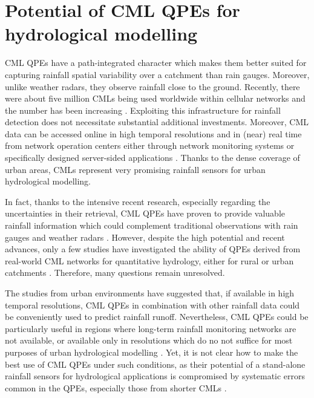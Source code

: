 \documentclass{ctuthesis}\usepackage[]{graphicx}\usepackage[]{color}
\begin{document}
\section{Potential of CML QPEs for hydrological modelling}

CML QPEs have a path-integrated character which makes them better suited for capturing rainfall spatial variability over a catchment than rain gauges. Moreover, unlike weather radars, they observe rainfall close to the ground. Recently, there were about five million CMLs being used worldwide within cellular networks and the number has been increasing \citep{ericssonEricssonMicrowaveOutlook2018}. Exploiting this infrastructure for rainfall detection does not necessitate substantial additional investments. Moreover, CML data can be accessed online in high temporal resolutions and in (near) real time from network operation centers either through network monitoring systems or specifically designed server-sided applications \citep{chwalaRealtimeDataAcquisition2016}. Thanks to the dense coverage of urban areas, CMLs represent very promising rainfall sensors for urban hydrological modelling.

In fact, thanks to the intensive recent research, especially regarding the uncertainties in their retrieval, CML QPEs have proven to provide valuable rainfall information which could complement traditional observations with rain gauges and weather radars \citep{chwalaCommercialMicrowaveLink2019, imhoffRainfallNowcastingUsing2020, riosgaonaRainfallRetrievalCommercial2018, uijlenhoetOpportunisticRemoteSensing2018}. However, despite the high potential and recent advances, only a few studies have investigated the ability of QPEs derived from real-world CML networks for quantitative hydrology, either for rural \citep{brauerEffectDifferencesRainfall2016, cazzanigaCalculatingHydrologicalResponse2020, smiatekPotentialCommercialMicrowave2017} or urban catchments \citep{dischImpactDifferentSources2019, stranskyRunoffPredictionUsing2018}. Therefore, many questions remain unresolved.

The studies from urban environments  \citep{dischImpactDifferentSources2019, stranskyRunoffPredictionUsing2018} have suggested that, if available in high temporal resolutions, CML QPEs in combination with other rainfall data could be conveniently used to predict rainfall runoff. Nevertheless, CML QPEs could be particularly useful in regions where long-term rainfall monitoring networks are not available, or available only in resolutions which do no not suffice for most purposes of urban hydrological modelling \citep{gossetImprovingRainfallMeasurement2016}. Yet, it is not clear how to make the best use of  CML QPEs under such conditions, as their potential of a stand-alone rainfall sensors for hydrological applications is compromised by systematic errors common in the QPEs, especially those from shorter CMLs \citep{leijnseMicrowaveLinkRainfall2008}. 
\end{document}
